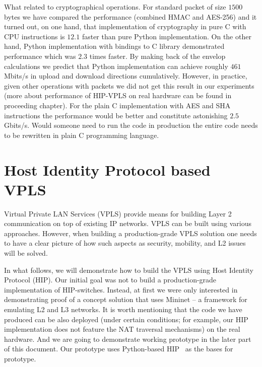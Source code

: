 What related to cryptographical operations. For standard packet of size $1500$ 
bytes we have compared the performance (combined HMAC and AES-256) and it turned 
out, on one hand, that implementation of cryptography in pure C with CPU instructions is 
$12.1$ faster than pure Python implementation. On the other hand, Python implementation with bindings
to C library demonstrated performance which was $2.3$ times faster. By making back of the envelop calculations
we predict that Python implementation can achieve roughly $461$ Mbits/s in upload and download directions
cumulatively. However, in practice, given other operations with packets we did not get this result 
in our experiments (more about performance of HIP-VPLS on real hardware can be found in proceeding 
chapter). For the plain C implementation with AES and SHA instructions the performance would be 
better and constitute astonishing $2.5$ Gbits/s. Would someone need to run the code in production
the entire code needs to be rewritten in plain C programming language.

\section{Host Identity Protocol based VPLS}

Virtual Private LAN Services (VPLS) provide means for building Layer 2 communication 
on top of existing IP networks. VPLS can be built using various approaches. However, 
when building a production-grade VPLS solution one needs to have a clear picture of 
how such aspects as security, mobility, and L2 issues will be solved.

In what follows, we will demonstrate how to build the VPLS using Host Identity Protocol (HIP). 
Our initial goal was not to build a production-grade implementation of HIP-switches. Instead, 
at first we were only interested in demonstrating proof of a concept solution that uses 
Mininet – a framework for emulating L2 and L3 networks. It is worth mentioning that the code 
we have produced can be also deployed (under certain conditions; for example, our HIP implementation 
does not feature the NAT traversal mechanisms) on the real hardware. And we are going to demonstrate 
working prototype in the later part of this document. Our prototype uses Python-based HIP~\cite{pyhip} 
as the bases for prototype.

